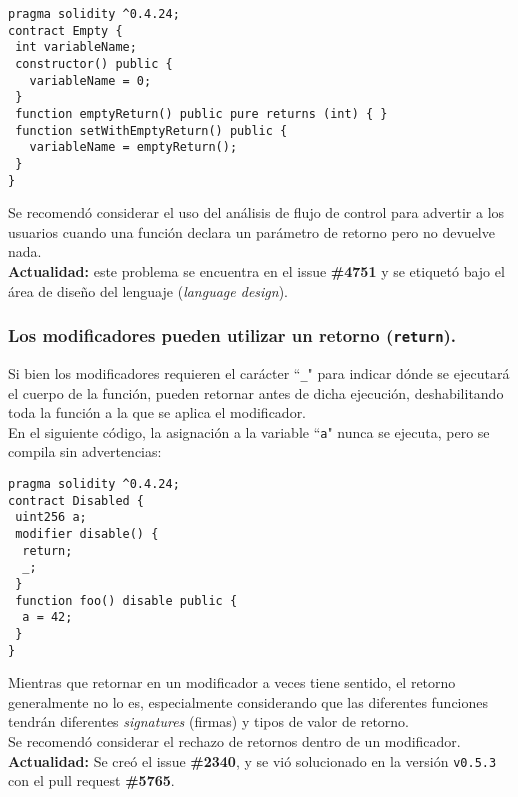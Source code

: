 \begin{lstlisting}[language=Solidity, caption={Código de ejemplo con return vacío.}]
pragma solidity ^0.4.24;
contract Empty {
 int variableName;
 constructor() public {
   variableName = 0;
 }
 function emptyReturn() public pure returns (int) { }
 function setWithEmptyReturn() public {
   variableName = emptyReturn();
 }
}
\end{lstlisting}

Se recomendó considerar el uso del análisis de flujo de control para advertir a los usuarios cuando una función declara un parámetro de retorno pero no devuelve nada.\\

\textbf{Actualidad:} este problema se encuentra en el issue \textbf{\#4751}\cite{GHI4751} y se etiquetó bajo el área de diseño del lenguaje (\textit{language design}).\\

\subsubsection{Los modificadores pueden utilizar un retorno (\texttt{return}).}

Si bien los modificadores requieren el carácter ``\texttt{\_}" para indicar dónde se ejecutará el cuerpo de la función, pueden retornar antes de dicha ejecución, deshabilitando toda la función a la que se aplica el modificador.\\

En el siguiente código, la asignación a la variable ``\texttt{a}" nunca se ejecuta, pero se compila sin advertencias:
\begin{lstlisting}[language=Solidity, caption={Código de ejemplo para modificador con retorno}]
pragma solidity ^0.4.24;
contract Disabled {
 uint256 a;
 modifier disable() {
  return;
  _;
 }
 function foo() disable public {
  a = 42;
 }
}
\end{lstlisting}

Mientras que retornar en un modificador a veces tiene sentido, el retorno generalmente no lo es, especialmente considerando que las diferentes funciones tendrán diferentes \textit{signatures} (firmas) y tipos de valor de retorno.\\

Se recomendó considerar el rechazo de retornos dentro de un modificador.\\

\textbf{Actualidad:} Se creó el issue \textbf{\#2340}\cite{GHI2340}, y se vió solucionado en la versión \texttt{v0.5.3} con el pull request \textbf{\#5765}\cite{GHPR5765}.\\

